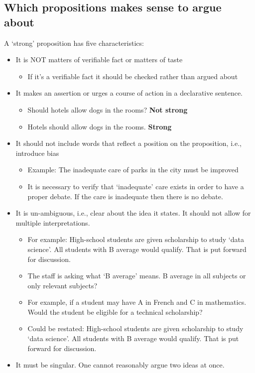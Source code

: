 \documentclass{article}
\begin{document}
\subsection{Which propositions makes sense to argue about}
A ‘strong’ proposition has five characteristics:
\begin{itemize}
  \item It is NOT matters of verifiable fact or matters of taste
  \begin{itemize}
    \item If it's a verifiable fact it should be checked rather than argued about
  \end{itemize}
  \item It makes an assertion or urges a course of action in a declarative sentence.
  \begin{itemize}
    \item Should hotels allow dogs in the rooms? \textbf{Not strong}
    \item Hotels should allow dogs in the rooms. \textbf{Strong}
  \end{itemize}
  \item It should not include words that reflect a position on the proposition, i.e., introduce bias
  \begin{itemize}
    \item Example: The inadequate care of parks in the city must be improved
    \item It is necessary to verify that ‘inadequate’ care exists in order to have a proper debate. If the care is inadequate then there is no debate.
  \end{itemize}
  \item It is un-ambiguous, i.e., clear about the idea it states. It should not allow for multiple interpretations.
  \begin{itemize}
    \item For example: High-school students are given scholarship to study ‘data science’. All students with B average would qualify. That is put forward for discussion.
    \item The staff is asking what ‘B average’ means. B average in all subjects or only relevant subjects?
    \item For example, if a student may have A in French and C in mathematics. Would the student be eligible for a technical scholarship?
    \item Could be restated: High-school students are given scholarship to study ‘data science’. All students with B average would qualify. That is put forward for discussion.
  \end{itemize}
  \item It must be singular. One cannot reasonably argue two ideas at once.
\end{itemize}
\end{document}
